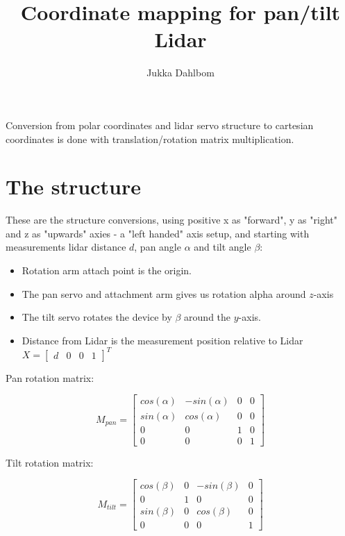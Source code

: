 \documentclass{article}
\begin{document}
\title{Coordinate mapping for pan/tilt Lidar}
\author{Jukka Dahlbom}
\maketitle


Conversion from polar coordinates and lidar servo structure
to cartesian coordinates is done with translation/rotation matrix
multiplication.
    
\section*{The structure}
These are the structure conversions, using positive x as "forward", y as "right" and z as "upwards" axies - a "left handed" axis setup,
and starting with measurements lidar distance $d$, pan angle $\alpha$ and tilt angle $\beta$:
\begin{itemize}
\item Rotation arm attach point is the origin.
\item The pan servo and attachment arm gives us rotation alpha around $z$-axis
\item The tilt servo rotates the device by $\beta$ around 
the $y$-axis.
\item Distance from Lidar is the measurement position relative to Lidar $X = \begin{bmatrix}d & 0 & 0 & 1 \end{bmatrix}^T$
\end{itemize}

Pan rotation matrix:

\begin{equation}
M_{pan} =
\begin{bmatrix}
  cos(\alpha) & -sin(\alpha) &	0	& 0\\
  sin(\alpha) &	cos(\alpha)	 &  0   & 0\\
  0			  & 0			 &	1	& 0\\
  0			  &	0			 &	0	& 1
\end{bmatrix}
\end{equation}

Tilt rotation matrix:

\begin{equation}
M_{tilt} =
\begin{bmatrix}
  cos(\beta)  & 0		     &	-sin(\beta)	& 0\\
  0			  &	1			 &  0   & 0\\
  sin(\beta)  & 0			 &	cos(\beta)	& 0\\
  0			  &	0			 &	0	& 1
\end{bmatrix}
\end{equation}
\end{document}
